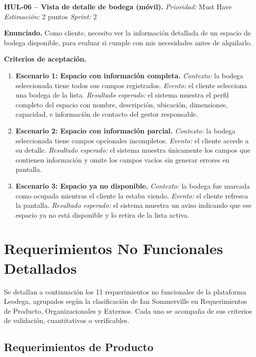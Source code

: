 \textbf{HUL-06 -- Vista de detalle de bodega (móvil).} \label{req:HUL-06}
\textit{Prioridad:} Must Have \quad \textit{Estimación:} 2 puntos \quad \textit{Sprint:} 2

\textbf{Enunciado.} Como cliente, necesito ver la información detallada de un espacio de bodega disponible, para evaluar si cumple con mis necesidades antes de alquilarlo.

\textbf{Criterios de aceptación.}
\begin{enumerate}
\item \textbf{Escenario 1: Espacio con información completa.} \textit{Contexto:} la bodega seleccionada tiene todos sus campos registrados. \textit{Evento:} el cliente selecciona una bodega de la lista. \textit{Resultado esperado:} el sistema muestra el perfil completo del espacio con nombre, descripción, ubicación, dimensiones, capacidad, e información de contacto del gestor responsable.
\item \textbf{Escenario 2: Espacio con información parcial.} \textit{Contexto:} la bodega seleccionada tiene campos opcionales incompletos. \textit{Evento:} el cliente accede a su detalle. \textit{Resultado esperado:} el sistema muestra únicamente los campos que contienen información y omite los campos vacíos sin generar errores en pantalla.
\item \textbf{Escenario 3: Espacio ya no disponible.} \textit{Contexto:} la bodega fue marcada como ocupada mientras el cliente la estaba viendo. \textit{Evento:} el cliente refresca la pantalla. \textit{Resultado esperado:} el sistema muestra un aviso indicando que ese espacio ya no está disponible y lo retira de la lista activa.
\end{enumerate}

\clearpage

\section{Requerimientos No Funcionales Detallados}
\label{anexo:ers-rnf}

\noindent Se detallan a continuación los 11 requerimientos no funcionales de la plataforma Leodega, agrupados según la clasificación de Ian Sommerville en Requerimientos de Producto, Organizacionales y Externos. Cada uno se acompaña de sus criterios de validación, cuantitativos o verificables.

\subsection{Requerimientos de Producto}

